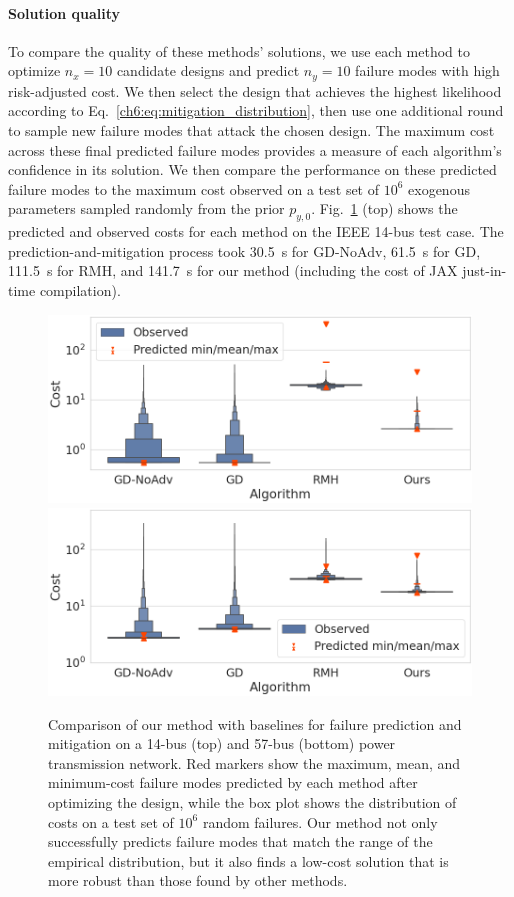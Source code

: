 \paragraph{Solution quality} To compare the quality of these methods' solutions, we use each method to optimize $n_x = 10$ candidate designs and predict $n_y=10$ failure modes with high risk-adjusted cost. We then select the design that achieves the highest likelihood according to Eq.~\eqref{ch6:eq:mitigation_distribution}, then use one additional round to sample new failure modes that attack the chosen design. The maximum cost across these final predicted failure modes provides a measure of each algorithm's confidence in its solution. We then compare the performance on these predicted failure modes to the maximum cost observed on a test set of $10^6$ exogenous parameters sampled randomly from the prior $p_{y, 0}$. Fig.~\ref{ch6:fig:14_bus_comparison} (top) shows the predicted and observed costs for each method on the IEEE 14-bus test case. The prediction-and-mitigation process took \SI{30.5}{s} for GD-NoAdv, \SI{61.5}{s} for GD, \SI{111.5}{s} for RMH, and \SI{141.7}{s} for our method (including the cost of JAX just-in-time compilation).

\begin{figure}[tb]
    \centering
    \includegraphics[width=0.45\linewidth]{images/ch6/14_bus_comparison.png}
    \includegraphics[width=0.45\linewidth]{images/ch6/57_bus_comparison.png}
    \caption{Comparison of our method with baselines for failure prediction and mitigation on a 14-bus (top) and 57-bus (bottom) power transmission network. Red markers show the maximum, mean, and minimum-cost failure modes predicted by each method after optimizing the design, while the box plot shows the distribution of costs on a test set of $10^6$ random failures. Our method not only successfully predicts failure modes that match the range of the empirical distribution, but it also finds a low-cost solution that is more robust than those found by other methods.}
    \label{ch6:fig:14_bus_comparison}
\end{figure}

